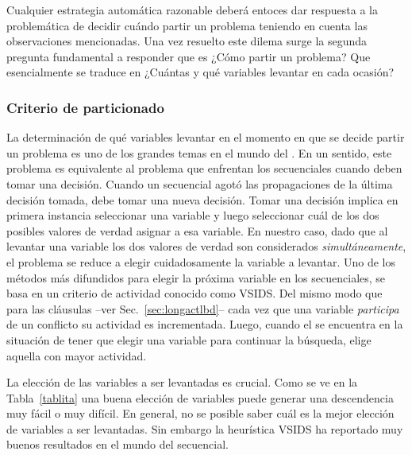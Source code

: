 Cualquier estrategia automática razonable deberá entoces dar respuesta a la
problemática de decidir cuándo partir un problema teniendo en cuenta las
observaciones mencionadas. Una vez resuelto este dilema surge la segunda
pregunta fundamental a responder que es ¿Cómo partir un problema? Que
esencialmente se traduce en ¿Cuántas y qué variables levantar en cada ocasión?

\subsubsection{Criterio de particionado}

\newcommand{\vsids}{VSIDS\xspace}

La determinación de qué variables levantar en el momento en que se decide
partir un problema es uno de los grandes temas en el mundo del \ssolving. En
un sentido, este problema es equivalente al problema que enfrentan los
\ssolver secuenciales cuando deben tomar una decisión. Cuando un \ssolver
secuencial agotó las propagaciones de la última decisión tomada, debe tomar
una nueva decisión. Tomar una decisión implica en primera instancia
seleccionar una variable y luego seleccionar cuál de los dos posibles valores
de verdad asignar a esa variable. En nuestro caso, dado que al levantar una
variable los dos valores de verdad son considerados \emph{simultáneamente}, el
problema se reduce a elegir cuidadosamente la variable a levantar. Uno de los
métodos más difundidos para elegir la próxima variable en los \ssolvers
secuenciales, se basa en un criterio de actividad conocido como \vsids. Del
mismo modo que para las cláusulas --ver Sec.~\ref{sec:longactlbd}-- cada vez que
una variable \emph{participa} de un conflicto su actividad es incrementada.
Luego, cuando el \ssolver se encuentra en la situación de tener que elegir una
variable para continuar la búsqueda, elige aquella con mayor actividad.

La elección de las variables a ser levantadas es crucial. Como se ve en
la Tabla~\ref{tablita} una buena elección de variables puede generar una
descendencia muy fácil o muy difícil. En general, no se posible saber cuál es
la mejor elección de variables a ser levantadas. Sin embargo la heurística
\vsids ha reportado muy buenos resultados en el mundo del \ssolving secuencial.



